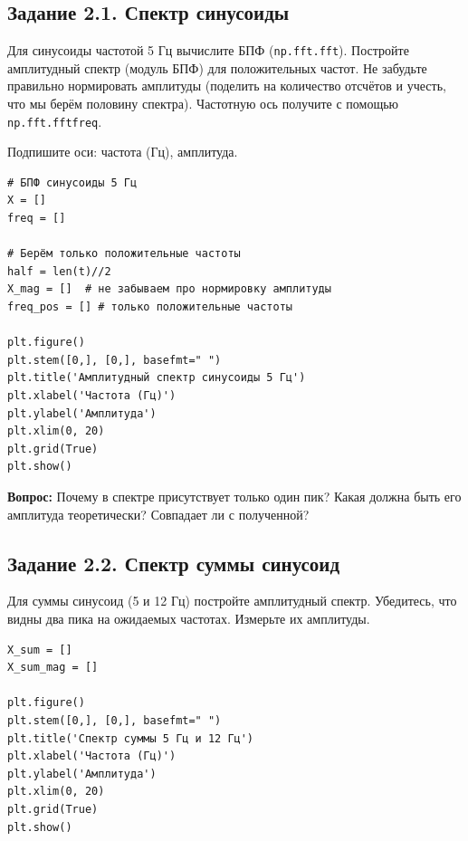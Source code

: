 \documentclass[12pt,a4paper,openany]{book}
\begin{document}
\subsection*{Задание 2.1. Спектр синусоиды}

Для синусоиды частотой 5 Гц вычислите БПФ (\texttt{np.\allowbreak{}fft.\allowbreak{}fft}). Постройте амплитудный спектр (модуль БПФ) для положительных частот. Не забудьте правильно нормировать амплитуды (поделить на количество отсчётов и учесть, что мы берём половину спектра). Частотную ось получите с помощью \texttt{np.\allowbreak{}fft.\allowbreak{}fftfreq}.

Подпишите оси: частота (Гц), амплитуда.

\begin{Verbatim}[fontsize=\small, breaklines, breakanywhere, frame=single, framesep=2mm]
# БПФ синусоиды 5 Гц
X = []
freq = []

# Берём только положительные частоты
half = len(t)//2
X_mag = []  # не забываем про нормировку амплитуды
freq_pos = [] # только положительные частоты

plt.figure()
plt.stem([0,], [0,], basefmt=" ")
plt.title('Амплитудный спектр синусоиды 5 Гц')
plt.xlabel('Частота (Гц)')
plt.ylabel('Амплитуда')
plt.xlim(0, 20)
plt.grid(True)
plt.show()
\end{Verbatim}

\textbf{Вопрос:} Почему в спектре присутствует только один пик? Какая должна быть его амплитуда теоретически? Совпадает ли с полученной?

\subsection*{Задание 2.2. Спектр суммы синусоид}

Для суммы синусоид (5 и 12 Гц) постройте амплитудный спектр. Убедитесь, что видны два пика на ожидаемых частотах. Измерьте их амплитуды.

\begin{Verbatim}[fontsize=\small, breaklines, breakanywhere, frame=single, framesep=2mm]
X_sum = []
X_sum_mag = []

plt.figure()
plt.stem([0,], [0,], basefmt=" ")
plt.title('Спектр суммы 5 Гц и 12 Гц')
plt.xlabel('Частота (Гц)')
plt.ylabel('Амплитуда')
plt.xlim(0, 20)
plt.grid(True)
plt.show()
\end{Verbatim}
\end{document}
